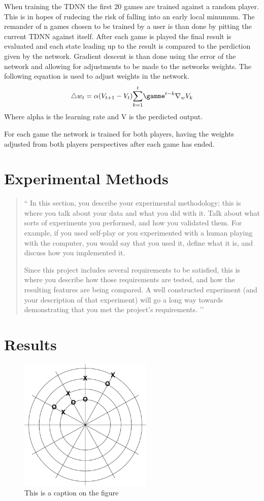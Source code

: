 \documentclass[12pt,letterpaper]{article}
\begin{document}
When training the TDNN the first 20 games are trained against a random player. This is in hopes of rudecing the risk of falling into an early local minumum. The remander of n games chosen to be trained by a user is than done by pitting the current TDNN against itself. After each game is played the final result is evaluated and each state leading up to the result is compared to the perdiction given by the network. Gradient descent is than done using the error of the network and allowing for adjustments to be made to the networks weights. The following equation is used to adjust weights in the network. 
\[
{\triangle} w_t = \alpha (V _{t + 1} - V _t)  \overset{t}{\sum_{k = 1}} {\gamme}^{t - k} {\nabla}_w V_k
\]
Where alpha is the learning rate and V is the perdicted output.

For each game the network is trained for both players, having the weights adjusted from both players perspectives after each game has ended.

\section{Experimental Methods}
\begin{quote}
`` 
In this section, you describe your experimental methodology; this is where you talk
about your data and what you did with it.  Talk about what sorts of experiments
you performed, and how you validated them.  For example, if you used self-play
or you experimented with a human playing with the computer, you would say that 
you used it, define what it is, and discuss how you implemented it.  

Since this project includes several requirements to be satisfied, this is where you describe
how those requirements are tested, and how the resulting features are being compared.
A well constructed experiment (and your description of that experiment) will go a long
way towards demonstrating that you met the project's requirements.
’’
\end{quote}

\section{Results}
\begin{figure}
\begin{center}
\includegraphics[width=2.5in]{P-TTT-ex.png}
\end{center}
\caption{This is a caption on the figure}
\label{somefigure}
\end{figure}
\end{document}
